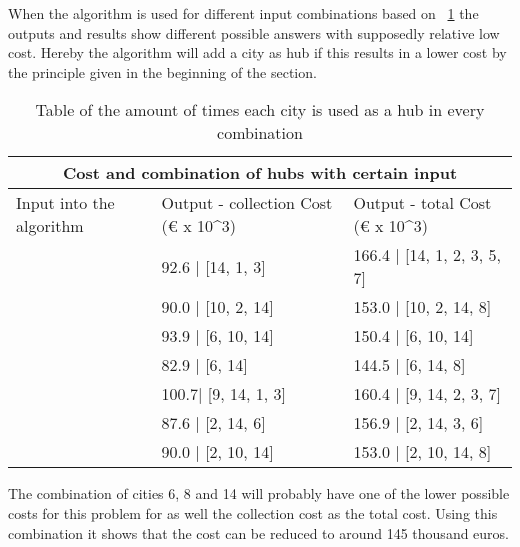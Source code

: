 \documentclass{article}
\begin{document}
            When the algorithm is used for different input combinations based on ~\ref{amount of times hubs are used in collection} the outputs and results show different possible answers with supposedly relative low cost. Hereby the algorithm will add a city as hub if this results in a lower cost by the principle given in the beginning of the section. 
    
            \begin{table}[h!]
                \begin{center}
                    \begin{tabular}{ |p{3cm}|p{3cm}|p{4cm}|}
                        \hline
                        \multicolumn{3}{|c|}{Cost and combination of hubs with certain input} \\
                        \hline
                        Input into the algorithm & Output -  collection Cost (€ x 10^3) & Output - total Cost (€ x 10^3)\\
                        \hline
                        [14] &  92.6 | [14, 1, 3] & 166.4 | [14, 1, 2, 3, 5, 7]  \\
                        \hline
                        [10] & 90.0 | [10, 2, 14]   & 153.0 | [10, 2, 14, 8] \\
                        \hline
                        [6, 10]& 93.9 | [6, 10, 14] & 150.4 |  [6, 10, 14]\\
                        \hline
                        [6, 14] &  82.9 | [6, 14]  &  144.5 | [6, 14, 8] \\
                        \hline
                        [9, 14] &  100.7| [9, 14, 1, 3] & 160.4 |  [9, 14, 2, 3, 7] \\
                        \hline
                        [2, 14] & 87.6 | [2, 14, 6] & 156.9 |  [2, 14, 3, 6]\\
                        \hline
                        [2, 10, 14] & 90.0 | [2, 10, 14] & 153.0 | [2, 10, 14, 8]  \\
                        \hline
                    \end{tabular}
                \end{center}
            \caption{Table of the amount of times each city is used as a hub in every combination}
            \label{amount of times hubs are used in collection} 
            \end{table}
    
            The combination of cities 6, 8 and 14 will probably have one of the lower possible costs for this problem for as well the collection cost as the total cost. Using this combination it shows that the cost can be reduced to around 145 thousand euros. 
\end{document}
